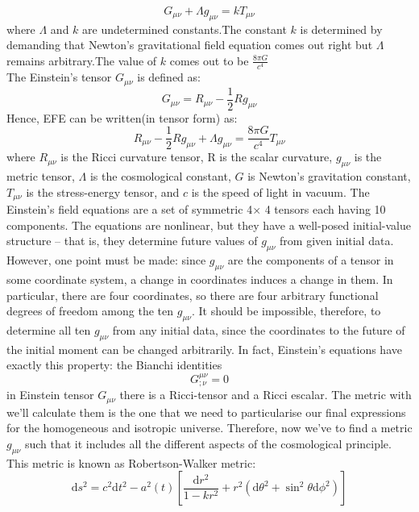 \documentclass[12pt]{article}
\begin{document}
\begin{equation}
G_{\mu \nu}+\Lambda g_{\mu \nu}=k T_{\mu \nu}
\end{equation}
where $\Lambda$ and $k$ are undetermined constants.The constant $k$ is determined by demanding that Newton's gravitational field equation comes out right but $\Lambda$ remains arbitrary.The value of $k$ comes out to be  $\frac{8 \pi G}{c^{4}}$\\
The Einstein's tensor $G_{\mu \nu}$ is defined as:
\begin{equation}
G_{\mu \nu}=R_{\mu \nu}-\frac{1}{2} R g_{\mu \nu}
\end{equation}
Hence, EFE can be written(in tensor form) as:
\begin{equation}
R_{\mu \nu}-\frac{1}{2} R g_{\mu \nu}+\Lambda g_{\mu \nu}=\frac{8 \pi G}{c^{4}} T_{\mu \nu}
\label{Einstein}
\end{equation}
where $R_{\mu \nu}$ is the Ricci curvature tensor, R is the scalar curvature, $g_{\mu \nu}$ is the metric tensor, $\Lambda$ is the cosmological constant, $G$ is Newton's gravitation constant, $T_{\mu \nu}$ is the stress-energy tensor, and $c$ is the speed of light in vacuum. The Einstein's field equations are a set of symmetric 4$\times$ 4 tensors each having 10 components. The equations are nonlinear, but they have a well-posed initial-value structure – that is, they determine future values of $g_{\mu \nu}$ from given initial data. However, one point must be made: since $g_{\mu \nu}$ are the components of a tensor in some coordinate system, a change in coordinates induces a change in them. In particular, there are four coordinates, so there are four arbitrary functional degrees of freedom among the ten $g_{\mu \nu}$. It should be impossible, therefore, to determine all ten $g_{\mu \nu}$ from any initial data, since the coordinates to the future of the initial moment can be changed arbitrarily. In fact, Einstein’s equations have exactly this property: the Bianchi identities
\begin{equation}
G_{ ; \nu}^{\mu \nu}=0
\end{equation}
 in  Einstein  tensor $G_{\mu \nu}$  there  is  a  Ricci-tensor  and  a  Ricci  escalar. The metric with we'll calculate them is the one that we need to particularise our final expressions  for the homogeneous and isotropic universe. Therefore,  now  we've  to  find a metric $g_{\mu \nu}$ such that it includes all the different aspects of the cosmological principle. This metric is known as Robertson-Walker metric:
\begin{equation}
\mathrm{d} s^{2}=c^{2} \mathrm{d} t^{2}-a^{2}(t)\left[\frac{\mathrm{d} r^{2}}{1-k r^{2}}+r^{2}\left(\mathrm{d} \theta^{2}+\sin ^{2} \theta \mathrm{d} \phi^{2}\right)\right]
\end{equation}
\end{document}
